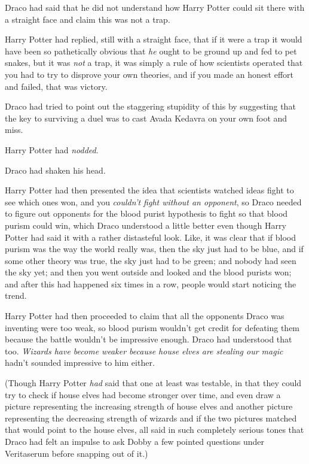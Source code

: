Draco had said that he did not understand how Harry Potter could sit there with a straight face and claim this was not a trap.

Harry Potter had replied, still with a straight face, that if it were a trap it would have been so pathetically obvious that \emph{he} ought to be ground up and fed to pet snakes, but it was \emph{not} a trap, it was simply a rule of how scientists operated that you had to try to disprove your own theories, and if you made an honest effort and failed, that was victory.

Draco had tried to point out the staggering stupidity of this by suggesting that the key to surviving a duel was to cast Avada Kedavra on your own foot and miss.

Harry Potter had \emph{nodded}.

Draco had shaken his head.

Harry Potter had then presented the idea that scientists watched ideas fight to see which ones won, and you \emph{couldn't fight without an opponent}, so Draco needed to figure out opponents for the blood purist hypothesis to fight so that blood purism could win, which Draco understood a little better even though Harry Potter had said it with a rather distasteful look. Like, it was clear that if blood purism was the way the world really was, then the sky just had to be blue, and if some other theory was true, the sky just had to be green; and nobody had seen the sky yet; and then you went outside and looked and the blood purists won; and after this had happened six times in a row, people would start noticing the trend.

Harry Potter had then proceeded to claim that all the opponents Draco was inventing were too weak, so blood purism wouldn't get credit for defeating them because the battle wouldn't be impressive enough. Draco had understood that too. \emph{Wizards have become weaker because house elves are stealing our magic} hadn't sounded impressive to him either.

(Though Harry Potter \emph{had} said that one at least was testable, in that they could try to check if house elves had become stronger over time, and even draw a picture representing the increasing strength of house elves and another picture representing the decreasing strength of wizards and if the two pictures matched that would point to the house elves, all said in such completely serious tones that Draco had felt an impulse to ask Dobby a few pointed questions under Veritaserum before snapping out of it.)

